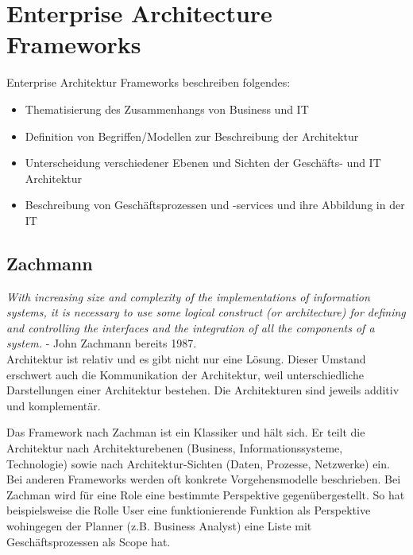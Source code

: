 \section{Enterprise Architecture Frameworks}

Enterprise Architektur Frameworks beschreiben folgendes:
\begin{itemize}
	\item Thematisierung des Zusammenhangs von Business und IT
	
	\item Definition von Begriffen/Modellen zur Beschreibung der Architektur
	
	\item Unterscheidung verschiedener Ebenen und Sichten der Geschäfts- und IT Architektur
	
	\item Beschreibung von Geschäftsprozessen und -services und ihre Abbildung in der IT
\end{itemize}

\subsection{Zachmann}

\textit{With increasing size and complexity of the implementations of information systems, it is necessary to use some logical construct (or architecture) for defining and controlling the interfaces and the integration of all the components of a system.} - John Zachmann bereits 1987. \\

Architektur ist relativ und es gibt nicht nur eine Lösung. Dieser Umstand erschwert auch die Kommunikation der Architektur, weil unterschiedliche Darstellungen einer Architektur bestehen. Die Architekturen sind jeweils additiv und komplementär.

Das Framework nach Zachman ist ein Klassiker und hält sich. Er teilt die Architektur nach Architekturebenen (Business, Informationssysteme, Technologie) sowie nach Architektur-Sichten (Daten, Prozesse, Netzwerke) ein. Bei anderen Frameworks werden oft konkrete Vorgehensmodelle beschrieben. Bei Zachman wird für eine Role eine bestimmte Perspektive gegenübergestellt. So hat beispielsweise die Rolle User eine funktionierende Funktion als Perspektive wohingegen der Planner (z.B. Business Analyst) eine Liste mit Geschäftsprozessen als Scope hat.

